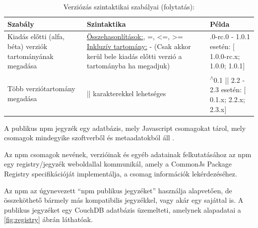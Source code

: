 	\begin{table}[h]
		\caption{Verziózás szintaktikai szabályai (folytatás):}
		\label{tab:sem-ver-pt2}
		\begin{tabularx}{\textwidth} { 
				| >{\centering\arraybackslash}X 
				| >{\centering\arraybackslash}X 
				| >{\centering\arraybackslash}X | }
			\hline
			\textbf{Szabály} & \textbf{Szintaktika} & \textbf{Példa} \\
			\hline 
			Kiadás előtti (alfa, béta) verziók tartományának megadása & \underline{Összehasonlítások:}\newline <, >, =, <=, >= \underline{Inkluzív tartomány:} - \newline(Csak akkor kerül bele kiadás előtti verzió a tartományba ha megadjuk) & 1.0.0-rc.0 - 1.0.1 esetén: $\big[$1.0.0-rc.x; 1.0.0; 1.0.1$\big]$ \\
			\hline
			Több verziótartomány megadása & || karakterekkel lehetséges & \textsuperscript{$\wedge$}0.1 ||  2.2 - 2.3 esetén: $\big[$0.1.x; 2.2.x; 2.3.x$\big]$\\
			\hline
		\end{tabularx}
	\end{table}


A publikus npm jegyzék egy adatbázis, mely Javascript csomagokat tárol, mely csomagok mindegyike szoftverből és metaadatokból áll \cite{npm-registry}.

Az npm csomagok nevének, verzióinak és egyéb adatainak felkutatásához az npm egy registry/jegyzék weboldallal kommunikál, amely a CommonJs Package Registry specifikációját \cite{commonjs-spec} implementálja, a csomag információk lekérdezéséhez.
 
Az npm az úgynevezett “npm publikus jegyzéket” használja alapvetően, de összeköthető bármely más kompatibilis jegyzékkel, vagy akár egy sajáttal is. A publikus jegyzéket egy CouchDB adatbázis üzemelteti, amelynek alapadatai a \ref{fig:registry} ábrán láthatóak.\\

